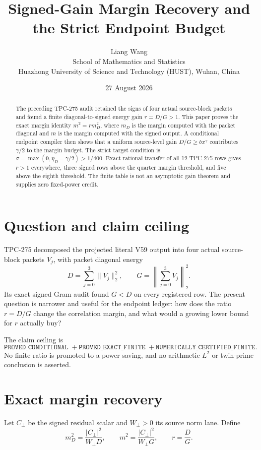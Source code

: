 \documentclass[11pt]{article}
\title{Signed-Gain Margin Recovery and the Strict Endpoint Budget}
\author{Liang Wang\\
School of Mathematics and Statistics\\
Huazhong University of Science and Technology (HUST), Wuhan, China}
\date{27 August 2026}
\newcommand{\Cperp}{C_{\perp}}
\newcommand{\Wperp}{W_{\perp}}
\newcommand{\Dpack}{D}
\newcommand{\Gpack}{G}
\newcommand{\md}{m_D}
\begin{document}
\maketitle

\begin{abstract}
The preceding TPC-275 audit retained the signs of four actual source-block
packets and found a finite diagonal-to-signed energy gain
\(r=D/G>1\).  This paper proves the exact margin identity
\(m^2=r m_D^2\), where \(m_D\) is the margin computed with the packet
diagonal and \(m\) is the margin computed with the signed output.  A conditional
endpoint compiler then shows that a uniform source-level gain
\(D/G\geq b x^\gamma\) contributes \(\gamma/2\) to the margin budget.  The
strict target condition is
\(\sigma-\max(0,\eta_D-\gamma/2)>1/400\).  Exact rational transfer of all
12 TPC-275 rows gives \(r>1\) everywhere, three signed rows above the quarter
margin threshold, and five above the eighth threshold.  The finite table is not
an asymptotic gain theorem and supplies zero fixed-power credit.
\end{abstract}

\section{Question and claim ceiling}

TPC-275 decomposed the projected literal V59 output into four actual
source-block packets \(V_j\), with packet diagonal energy
\[
 \Dpack=\sum_{j=0}^3\|V_j\|_2^2,
 \qquad \Gpack=\left\|\sum_{j=0}^3V_j\right\|_2^2.
\]
Its exact signed Gram audit found \(\Gpack<\Dpack\) on every registered row.
The present question is narrower and useful for the endpoint ledger: how does
the ratio \(r=\Dpack/\Gpack\) change the correlation margin, and what would a
growing lower bound for \(r\) actually buy?

The claim ceiling is
\[
 \texttt{PROVED\_CONDITIONAL}\;+
 \texttt{PROVED\_EXACT\_FINITE}\;+
 \texttt{NUMERICALLY\_CERTIFIED\_FINITE}.
\]
No finite ratio is promoted to a power saving, and no arithmetic \(L^2\) or
twin-prime conclusion is asserted.

\section{Exact margin recovery}

Let \(\Cperp\) be the signed residual scalar and \(\Wperp>0\) its source
norm lane.  Define
\[
 \md^2=\frac{|\Cperp|^2}{\Wperp\Dpack},
 \qquad
 m^2=\frac{|\Cperp|^2}{\Wperp\Gpack},
 \qquad r=\frac{\Dpack}{\Gpack}.
\]
\end{document}
